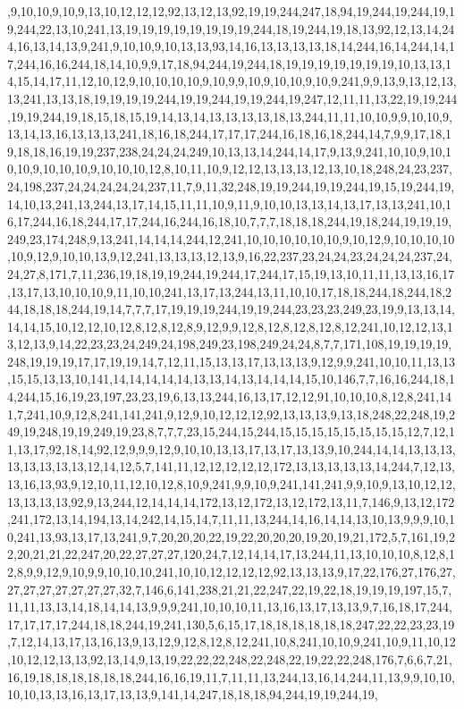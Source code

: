 ,9,10,10,9,10,9,13,10,12,12,12,92,13,12,13,92,19,19,244,247,18,94,19,244,19,244,19,19,244,22,13,10,241,13,19,19,19,19,19,19,19,19,244,18,19,244,19,18,13,92,12,13,14,244,16,13,14,13,9,241,9,10,10,9,10,13,13,93,14,16,13,13,13,13,18,14,244,16,14,244,14,17,244,16,16,244,18,14,10,9,9,17,18,94,244,19,244,18,19,19,19,19,19,19,19,10,13,13,14,15,14,17,11,12,10,12,9,10,10,10,10,9,10,9,9,10,9,10,10,9,10,9,241,9,9,13,9,13,12,13,13,241,13,13,18,19,19,19,19,244,19,19,244,19,19,244,19,247,12,11,11,13,22,19,19,244,19,19,244,19,18,15,18,15,19,14,13,14,13,13,13,13,18,13,244,11,11,10,10,9,9,10,10,9,13,14,13,16,13,13,13,241,18,16,18,244,17,17,17,244,16,18,16,18,244,14,7,9,9,17,18,19,18,18,16,19,19,237,238,24,24,24,249,10,13,13,14,244,14,17,9,13,9,241,10,10,9,10,10,10,9,10,10,10,9,10,10,10,12,8,10,11,10,9,12,12,13,13,13,12,13,10,18,248,24,23,237,24,198,237,24,24,24,24,24,237,11,7,9,11,32,248,19,19,244,19,19,244,19,15,19,244,19,14,10,13,241,13,244,13,17,14,15,11,11,10,9,11,9,10,10,13,13,14,13,17,13,13,241,10,16,17,244,16,18,244,17,17,244,16,244,16,18,10,7,7,7,18,18,18,244,19,18,244,19,19,19,249,23,174,248,9,13,241,14,14,14,244,12,241,10,10,10,10,10,10,9,10,12,9,10,10,10,10,10,9,12,9,10,10,13,9,12,241,13,13,13,12,13,9,16,22,237,23,24,24,23,24,24,24,237,24,24,27,8,171,7,11,236,19,18,19,19,244,19,244,17,244,17,15,19,13,10,11,11,13,13,16,17,13,17,13,10,10,10,9,11,10,10,241,13,17,13,244,13,11,10,10,17,18,18,244,18,244,18,244,18,18,18,244,19,14,7,7,7,17,19,19,19,244,19,19,244,23,23,23,249,23,19,9,13,13,14,14,14,15,10,12,12,10,12,8,12,8,12,8,9,12,9,9,12,8,12,8,12,8,12,8,12,241,10,12,12,13,13,12,13,9,14,22,23,23,24,249,24,198,249,23,198,249,24,24,8,7,7,171,108,19,19,19,19,248,19,19,19,17,17,19,19,14,7,12,11,15,13,13,17,13,13,13,9,12,9,9,241,10,10,11,13,13,15,15,13,13,10,141,14,14,14,14,14,13,13,14,13,14,14,14,15,10,146,7,7,16,16,244,18,14,244,15,16,19,23,197,23,23,19,6,13,13,244,16,13,17,12,12,91,10,10,10,8,12,8,241,141,7,241,10,9,12,8,241,141,241,9,12,9,10,12,12,12,92,13,13,13,9,13,18,248,22,248,19,249,19,248,19,19,249,19,23,8,7,7,7,23,15,244,15,244,15,15,15,15,15,15,15,15,12,7,12,11,13,17,92,18,14,92,12,9,9,9,12,9,10,10,13,13,17,13,17,13,13,9,10,244,14,14,13,13,13,13,13,13,13,13,12,14,12,5,7,141,11,12,12,12,12,12,172,13,13,13,13,13,14,244,7,12,13,13,16,13,93,9,12,10,11,12,10,12,8,10,9,241,9,9,10,9,241,141,241,9,9,10,9,13,10,12,12,13,13,13,13,92,9,13,244,12,14,14,14,172,13,12,172,13,12,172,13,11,7,146,9,13,12,172,241,172,13,14,194,13,14,242,14,15,14,7,11,11,13,244,14,16,14,14,13,10,13,9,9,9,10,10,241,13,93,13,17,13,241,9,7,20,20,20,22,19,22,20,20,20,19,20,19,21,172,5,7,161,19,22,20,21,21,22,247,20,22,27,27,27,120,24,7,12,14,14,17,13,244,11,13,10,10,10,8,12,8,12,8,9,9,12,9,10,9,9,10,10,10,241,10,10,12,12,12,12,92,13,13,13,9,17,22,176,27,176,27,27,27,27,27,27,27,27,32,7,146,6,141,238,21,21,22,247,22,19,22,18,19,19,19,197,15,7,11,11,13,13,14,18,14,14,13,9,9,9,241,10,10,10,11,13,16,13,17,13,13,9,7,16,18,17,244,17,17,17,17,244,18,18,244,19,241,130,5,6,15,17,18,18,18,18,18,18,247,22,22,23,23,19,7,12,14,13,17,13,16,13,9,13,12,9,12,8,12,8,12,241,10,8,241,10,10,9,241,10,9,11,10,12,10,12,12,13,13,92,13,14,9,13,19,22,22,22,248,22,248,22,19,22,22,248,176,7,6,6,7,21,16,19,18,18,18,18,18,18,244,16,16,19,11,7,11,11,13,244,13,16,14,244,11,13,9,9,10,10,10,10,13,13,16,13,17,13,13,9,141,14,247,18,18,18,94,244,19,19,244,19,